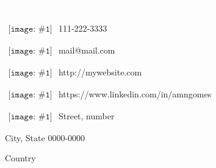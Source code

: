 
\newcommand{\ContactEntry}[2]{
	$\begin{array}{l}
	{\texttt{[image: \#1]}}
	\end{array}
	$ #2
}


\LARGE
\noindent\colorbox{materialGreen}
{\parbox[c][25pt][c]{\textwidth}{\hspace{15pt}\textcolor{white}{Contacts}}} %

\begin{multicols}{2}

\large
\ContactEntry{images/green/telephone1}{111-222-3333}

\ContactEntry{images/green/mail9}{mail@mail.com}

\ContactEntry{images/green/links1}{http://mywebsite.com}

\ContactEntry{images/green/linkedin2}{https://www.linkedin.com/in/amngomes}

\columnbreak

\ContactEntry{images/green/house3}{Street, number

\hspace*{25pt} City, State 0000-0000

\hspace*{25pt} Country}


\end{multicols}
